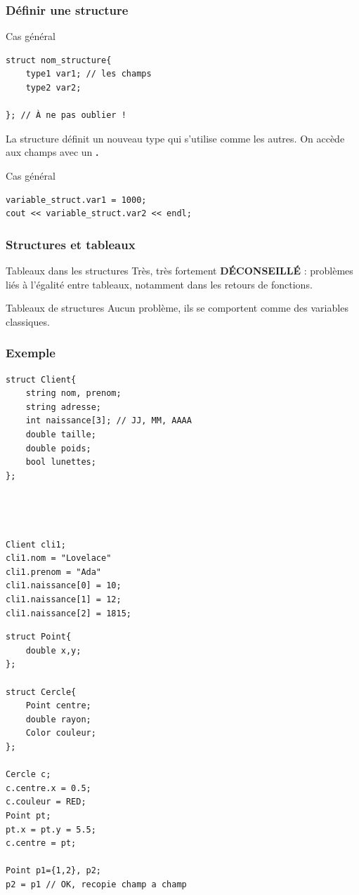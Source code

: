 \begin{frame}[fragile=singleslide]
	\frametitle{Définir une structure}
	
	\begin{block}{Cas général}
		\begin{verbatim}
struct nom_structure{
	type1 var1; // les champs
	type2 var2;

}; // À ne pas oublier !
        \end{verbatim}
	\end{block}
	
	La structure définit un nouveau type qui s'utilise comme les autres.
	On accède aux champs avec un \textbf{\huge .}
	
	\begin{block}{Cas général}
	\begin{verbatim}
variable_struct.var1 = 1000;
cout << variable_struct.var2 << endl;
    \end{verbatim}
	\end{block}
\end{frame}

\begin{frame}
	\frametitle{Structures et tableaux}
	\begin{alertblock}{Tableaux dans les structures}
		Très, très fortement \textbf{DÉCONSEILLÉ} : problèmes liés à l'égalité entre tableaux, notamment dans les retours de fonctions.
	\end{alertblock}
	
	\begin{block}{Tableaux de structures}
		Aucun problème, ils se comportent comme des variables classiques.
	\end{block}
\end{frame}

\begin{frame}[fragile=singleslide]
	\frametitle{Exemple}
	\begin{minipage}{0.47\linewidth}
		\begin{verbatim}
struct Client{
    string nom, prenom;
    string adresse;
    int naissance[3]; // JJ, MM, AAAA
    double taille; 
    double poids;
    bool lunettes;
};




Client cli1;
cli1.nom = "Lovelace"
cli1.prenom = "Ada"
cli1.naissance[0] = 10;
cli1.naissance[1] = 12;
cli1.naissance[2] = 1815;

		\end{verbatim}
	\end{minipage}
	\hfill
	\begin{minipage}{0.47\linewidth}
		\begin{verbatim}
struct Point{
	double x,y;
};

struct Cercle{
    Point centre;
    double rayon;
    Color couleur;
};

Cercle c;
c.centre.x = 0.5;
c.couleur = RED;
Point pt;
pt.x = pt.y = 5.5;
c.centre = pt;

Point p1={1,2}, p2;
p2 = p1 // OK, recopie champ a champ
		\end{verbatim}
	\end{minipage}
\end{frame}

